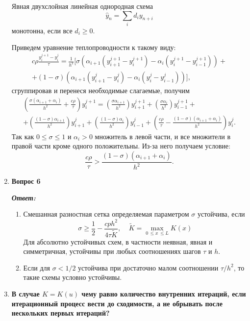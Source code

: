\documentclass[12pt, a4paper]{article}
\begin{document}
\begin{enumerate}
		Явная двухслойная линейная однородная схема 
		\[
		\hat{y}_n =\sum_{i} d_i y_{n + i}
		\]
		монотонна, если все $d_i \geq 0$.

		Приведем уравнение теплопроводности к такому виду:
		\begin{multline*}
			c \rho \frac{y_i^{j+1}-y_i^j}\tau = \frac1{h^2}\Big[\sigma \left(\alpha_{i+1}(y_{i+1}^{j+1}-y_i^{j+1}) - \alpha_i(y_i^{j+1}-y_{i-1}^{j+1})\right) + \\
			+ (1-\sigma)\left(\alpha_{i+1}(y_{i+1}^j - y_i^j) - \alpha_i (y_i^j - y_{i-1}^j)\right)\Big],
		\end{multline*}
		сгруппировав и перенеся необходимые слагаемые, получим
		\begin{multline*}
			\left(\frac{\sigma (\alpha_{i+1}+\alpha_i)}{h^2} + \frac{c\rho}\tau\right)y_i^{j+1} = \left(\frac{\sigma \alpha_{i+1}}{h^2}\right)y_{i+1}^{j+1} + \left(\frac{\sigma \alpha_i}{h^2}\right)y_{i-1}^{j+1} + \\
			+ \left(\frac{(1-\sigma)\alpha_{i+1}}{h^2}\right) y_{i+1}^j + \left(\frac{(1-\sigma)\alpha_i}{h^2}\right) y_{i-1}^j + \left(\frac{c\rho}{\tau} - \frac{(1-\sigma)(\alpha_{i+1} + \alpha_i)}{h^2}\right) y_i^j.
		\end{multline*}
		Так как $0 \leq \sigma \leq 1$ и $\alpha_i > 0$ множитель в левой части, и все множители в правой части кроме одного положительны. Из-за него получаем условие:
		\[
		\frac{c\rho}{\tau} > \frac{\left( 1 - \sigma \right) \left( \alpha_{i+1} + \alpha_i \right)}{h^2}.
		\]
		
		\item \textbf{Вопрос 6}
		\vspace*{0.2cm}
		
		\textit{\textbf{Ответ:}}
		
		\begin{enumerate}
			\item Смешанная разностная сетка определяемая параметром $\sigma$ устойчива, если
			\[
			\sigma \ge \dfrac{1}{2} - \dfrac{c p h^2}{4 \tau \tilde{K}}, \;\;\;\; \tilde{K}=\max\limits_{0 \, \le x \, \le L}{K(x)}
			\]
			Для абсолютно устойчивых схем, в частности неявная, явная и симметричная, устойчивы при любых соотношениях шагов $\tau$ и $h$.
			
			\item Если для $\sigma < 1/2$ устойчива при достаточно малом соотношении $\tau/h^2$, то такие схемы условно устойчивы.
		\end{enumerate}
		
		\item \textbf{В случае $K = K(u)$ чему равно количество внутренних итераций, если итерационный процесс вести до сходимости, а не обрывать после нескольких первых итераций?}
		\vspace*{0.2cm}
		

\end{enumerate}
\end{document}

